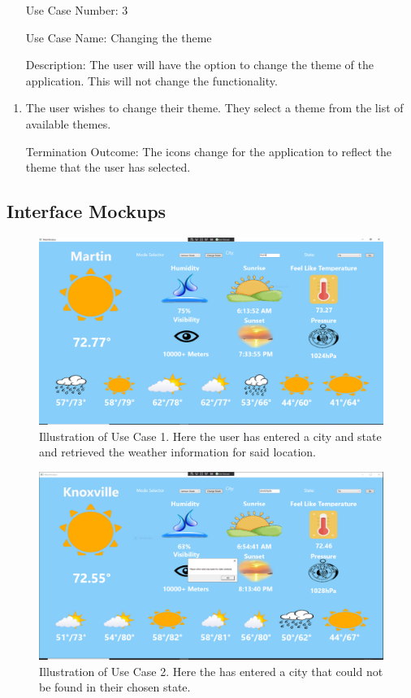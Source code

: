 \documentclass[10pt,conference,onecolumn,compsoc]{IEEEtran}
\begin{document}
\begin{itemize}
\item[Use Case Number:] 3
\item[Use Case Name:] Changing the theme
\item[Description:] The user will have the option to change the theme of the application. This will not change the functionality.
\end{itemize}

\begin{enumerate}
\item The user wishes to change their theme. They select a theme from the list of available themes.
\item[Termination Outcome:] The icons change for the application to reflect the theme that the user has selected. 
\end{enumerate}

\subsection{Interface Mockups}
\begin{figure}[ht!]
\includegraphics[scale=0.1]{use_case_1.png}
\caption{Illustration of Use Case 1. Here the user has entered a city and state and retrieved the weather information for said location.}
\label{use_case_1}
\end{figure}

\begin{figure}[ht!]
\includegraphics[scale=0.1]{use_case_2.png}
\caption{Illustration of Use Case 2. Here the has entered a city that could not be found in their chosen state.}
\label{use_case_2}
\end{figure}
\end{document}
